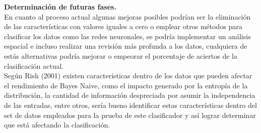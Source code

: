 \noindent
\textbf{Determinación de futuras fases.}\\

En cuanto al proceso actual algunas mejoras posibles podrían ser la eliminación
de las características con valores iguales a cero o emplear otros métodos para
clasificar los datos como las redes neuronales, se podría implementar un análisis
espacial e incluso realizar una revisión más profunda a los datos, cualquiera de
estás alternativas podría mejorar o empeorar el porcentaje de aciertos de la clasificación actual.\\

Según Rish (2001) existen características dentro de los datos que pueden afectar el
rendimiento de Bayes Naive, como el impacto generado por la entropía de la distribución, la
cantidad de información despreciada por asumir la independencia de las entradas, entre otros,
sería bueno identificar estas características dentro del set de datos empleados para la prueba de
este clasificador y así lograr determinar que está afectando la clasificación.